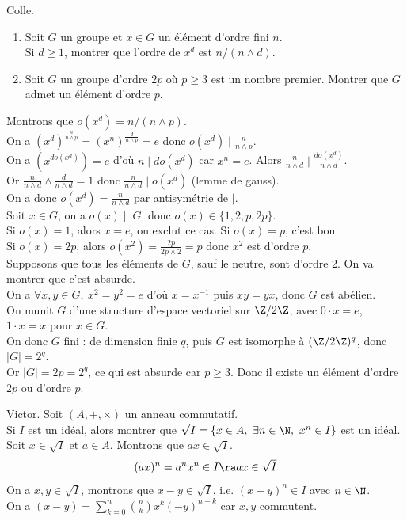 \documentclass[11pt]{article}
\begin{document}
\begin{exercice}{Colle.}{}
    \begin{enumerate}
        \item Soit $G$ un groupe et $x\in G$ un élément d'ordre fini $n$.\\
        Si $d\geq1$, montrer que l'ordre de $x^d$ est $n/(n\land d)$.
        \item Soit $G$ un groupe d'ordre $2p$ où $p\geq3$ est un nombre premier. Montrer que $G$ admet un élément d'ordre $p$.
    \end{enumerate}
    \tcblower
     Montrons que $o(x^d) = n/(n\land p)$.\\
    On a $\left(x^d\right)^{\frac{n}{n\land p}} = (x^n)^{\frac{d}{n\land p}}=e$ donc $o(x^d) \mid \frac{n}{n\land p}$.\\
    On a $(x^{do(x^d)})=e$ d'où $n \mid do(x^d)$ car $x^{n}=e$. Alors $\frac{n}{n\land d}\mid \frac{do(x^d)}{n\land d}$.\\
    Or $\frac{n}{n\land d} \land \frac{d}{n\land d} = 1$ donc $\frac{n}{n\land d}\mid o(x^d)$ (lemme de gauss).\\
    On a donc $o(x^d)=\frac{n}{n\land d}$ par antisymétrie de $\mid$.\\
     Soit $x\in G$, on a $o(x)\mid|G|$ donc $o(x)\in\{1,2,p,2p\}$.\\
    Si $o(x)=1$, alors $x=e$, on exclut ce cas. Si $o(x)=p$, c'est bon.\\
    Si $o(x)=2p$, alors $o(x^2)=\frac{2p}{2p\land 2}=p$ donc $x^2$ est d'ordre $p$.\\
    Supposons que tous les éléments de $G$, sauf le neutre, sont d'ordre 2. On va montrer que c'est absurde.\\
    On a $\forall x,y\in G, ~ x^2=y^2=e$ d'où $x=x^{-1}$ puis $xy=yx$, donc $G$ est abélien.\\
    On munit $G$ d'une structure d'espace vectoriel sur $\Z/2\Z$, avec $0\cdot x = e$, $1\cdot x=x$ pour $x\in G$.\\
    On donc $G$ fini : de dimension finie $q$, puis $G$ est isomorphe à $(\Z/2\Z)^q$, donc $|G|=2^q$.\\
    Or $|G|=2p=2^q$, ce qui est absurde car $p\geq3$. Donc il existe un élément d'ordre $2p$ ou d'ordre $p$.  
\end{exercice}

\vspace*{-0.7cm}

\begin{exercice}{Victor.}{}
    Soit $(A,+,\times)$ un anneau commutatif.\\
    Si $I$ est un idéal, alors montrer que $\sqrt{I}=\{x\in A, ~ \exists n \in \N, ~ x^n \in I\}$ est un idéal.
    \tcblower
    Soit $x \in \sqrt{I}$ et $a\in A$. Montrons que $ax\in\sqrt{I}$.
    \begin{equation*}
        (ax)^n = a^nx^n \in I \ra ax \in \sqrt{I}
    \end{equation*}
    On a $x,y\in\sqrt{I}$, montrons que $x-y\in\sqrt{I}$, i.e. $(x-y)^n\in I$ avec $n\in\N$.\\
    On a $(x-y)=\sum_{k=0}^n\binom{n}{k}x^k(-y)^{n-k}$ car $x,y$ commutent.
\end{exercice}
\end{document}
